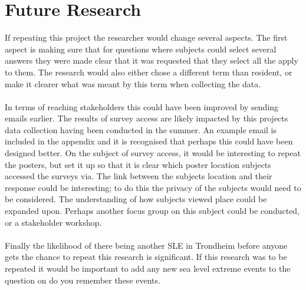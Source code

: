 

\section{Future Research}
If repeating this project the researcher would change several aspects. The first aspect is making sure that for questions where subjects could select several answers they were made clear that it was requested that they select all the apply to them. The research would also either chose a different term than resident, or make it clearer what was meant by this term when collecting the data. 
\paragraph{}
In terms of reaching stakeholders this could have been improved by sending emails earlier. The results of survey access are likely impacted by this projects data collection having been conducted in the summer. An example email is included in the appendix and it is recognised that perhaps this could have been designed better. On the subject of survey access, it would be interesting to repeat the posters, but set it up so that it is clear which poster location subjects accessed the surveys via. The link between the subjects location and their response could be interesting; to do this the privacy of the subjects would need to be considered. The understanding of how subjects viewed place could be expanded upon. Perhaps another focus group on this subject could be conducted, or a stakeholder workshop. 
\paragraph{}

Finally the likelihood of there being another SLE in Trondheim before anyone gets the chance to repeat this research is significant. If this research was to be repeated it would be important to add any new sea level extreme events to the question on do you remember these events. 


